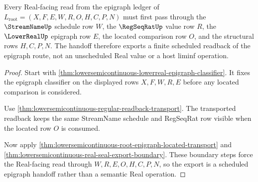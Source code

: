 \begin{theorem}
\label{thm:lowersemicontinuous-root-epigraph-regseqrat-handoff}
Every Real-facing read from the epigraph ledger of
$L_{\mathrm{root}}=(X,F,E,W,R,O,H,C,P,N)$ must first pass through the
$\StreamNameUp$ schedule row $W$, the $\RegSeqRatUp$ value row $R$, the
$\LowerRealUp$ epigraph row $E$, the located comparison row $O$, and the
structural rows $H,C,P,N$. The handoff therefore exports a finite scheduled
readback of the epigraph route, not an unscheduled Real value or a host liminf
operation.
\end{theorem}
\begin{proof}
Start with \autoref{thm:lowersemicontinuous-lowerreal-epigraph-classifier}. It
fixes the epigraph classifier on the displayed rows $X,F,W,R,E$ before any
located comparison is considered.

Use \autoref{thm:lowersemicontinuous-regular-readback-transport}. The
transported readback keeps the same StreamName schedule and RegSeqRat row
visible when the located row $O$ is consumed.

Now apply \autoref{thm:lowersemicontinuous-root-epigraph-located-transport} and
\autoref{thm:lowersemicontinuous-real-seal-export-boundary}. These boundary
steps force the Real-facing read through $W,R,E,O,H,C,P,N$, so the export is a
scheduled epigraph handoff rather than a semantic Real operation.
\end{proof}

